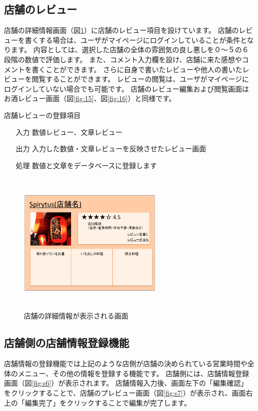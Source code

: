 \documentclass[a4j,titlepage]{jarticle}
\begin{document}
\subsection{店舗のレビュー}
店舗の詳細情報画面（図\ref{fig:17}）に店舗のレビュー項目を設けています。
店舗のレビューを書くする場合は、ユーザがマイページにログインしていることが条件となります。
内容としては、選択した店舗の全体の雰囲気の良し悪しを０〜５の６段階の数値で評価します。
また、コメント入力欄を設け、店舗に来た感想やコメントを書くことができます。
さらに自身で書いたレビューや他人の書いたレビューを閲覧することができます。
レビューの閲覧は、ユーザがマイページにログインしていない場合でも可能です。
店舗のレビュー編集および閲覧画面はお酒レビュー画面（図\ref{fig:15}、図\ref{fig:16}）と同様です。


店舗レビューの登録項目
\begin{enumerate}
  \item [入力] 数値レビュー、文章レビュー
  \item [出力] 入力した数値・文章レビューを反映させたレビュー画面
  \item [処理] 数値と文章をデータベースに登録します
\end{enumerate}

\begin {figure}[htbp]
    \begin{center}
    \includegraphics [height=7cm, width=7cm]{extrnal_design_document_image/17.eps}
    \caption {店舗の詳細情報が表示される画面}
    \label {fig:17}
    \end{center}
\end {figure}

\subsection{店舗側の店舗情報登録機能}
店舗情報の登録機能では上記のような店側が店舗の決められている営業時間や全体のメニュー、その他の情報を登録する機能です。
店舗側には、店舗情報登録画面（図\ref{fig:s6}）が表示されます。
店舗情報入力後、画面左下の「編集確認」をクリックすることで、店舗のプレビュー画面（図\ref{fig:s7}）が表示され、画面右上の「編集完了」をクリックすることで編集が完了します。
\end{document}
